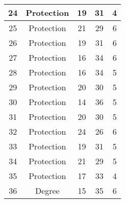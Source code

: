 \documentclass[results.tex]{subfiles}
\begin{document}
\begin{center}
\begin{tabular}{| c || c | c | c | c |}
            \hline
            24                      & Protection                   & 19                     & 31                      & 4                    \\
            \hline
            25                      & Protection                   & 21                     & 29                      & 6                    \\
            \hline
            26                      & Protection                   & 19                     & 31                      & 6                    \\
            \hline
            27                      & Protection                   & 16                     & 34                      & 6                    \\
            \hline
            28                      & Protection                   & 16                     & 34                      & 5                    \\
            \hline
            29                      & Protection                   & 20                     & 30                      & 5                    \\
            \hline
            30                      & Protection                   & 14                     & 36                      & 5                    \\
            \hline
            31                      & Protection                   & 20                     & 30                      & 5                    \\
            \hline
            32                      & Protection                   & 24                     & 26                      & 6                    \\
            \hline
            33                      & Protection                   & 19                     & 31                      & 5                    \\
            \hline
            34                      & Protection                   & 21                     & 29                      & 5                    \\
            \hline
            35                      & Protection                   & 17                     & 33                      & 4                    \\
            \hline
            36                      & Degree                       & 15                     & 35                      & 6                    \\

\end{tabular}
\end{center}
\end{document}
